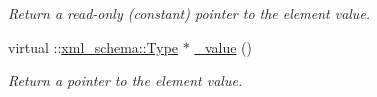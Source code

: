 \begin{DoxyCompactItemize}
\begin{DoxyCompactList}\small\item\em Return a read-\/only (constant) pointer to the element value. \item\end{DoxyCompactList}\item 
virtual ::\hyperlink{namespacexml__schema_ad34e8fd175bf4f9fece6c670b01aa239}{xml\_\-schema::Type} $\ast$ \hyperlink{classopenstack_1_1xml_1_1BackupOrResizeInProgress_a301d782a08f7bbd24402c451590dd2bc}{\_\-value} ()
\begin{DoxyCompactList}\small\item\em Return a pointer to the element value. \item\end{DoxyCompactList}\end{DoxyCompactItemize}
